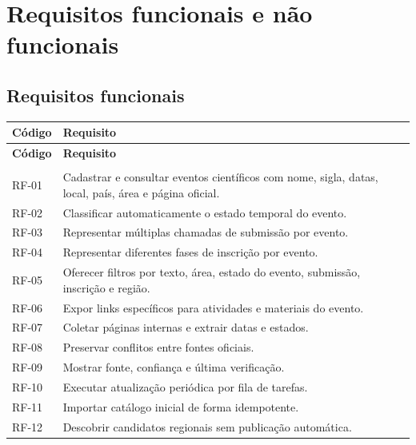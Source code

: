 \chapter{Requisitos funcionais e não funcionais}

\section{Requisitos funcionais}

\begin{center}
\small
\renewcommand{\arraystretch}{1.15}
\begin{longtable}{>{\RaggedRight\arraybackslash}p{}>{\RaggedRight\arraybackslash}p{}}
\toprule
\textbf{\textbf{Código}} & \textbf{\textbf{Requisito}} \\
\midrule
\endfirsthead
\toprule
\textbf{\textbf{Código}} & \textbf{\textbf{Requisito}} \\
\midrule
\endhead
\midrule
\multicolumn{2}{r}{\footnotesize Continua na próxima página} \\
\endfoot
\bottomrule
\endlastfoot
RF-01 & Cadastrar e consultar eventos científicos com nome, sigla, datas, local, país, área e página oficial. \\
RF-02 & Classificar automaticamente o estado temporal do evento. \\
RF-03 & Representar múltiplas chamadas de submissão por evento. \\
RF-04 & Representar diferentes fases de inscrição por evento. \\
RF-05 & Oferecer filtros por texto, área, estado do evento, submissão, inscrição e região. \\
RF-06 & Expor links específicos para atividades e materiais do evento. \\
RF-07 & Coletar páginas internas e extrair datas e estados. \\
RF-08 & Preservar conflitos entre fontes oficiais. \\
RF-09 & Mostrar fonte, confiança e última verificação. \\
RF-10 & Executar atualização periódica por fila de tarefas. \\
RF-11 & Importar catálogo inicial de forma idempotente. \\
RF-12 & Descobrir candidatos regionais sem publicação automática. \\
\end{longtable}
\end{center}

